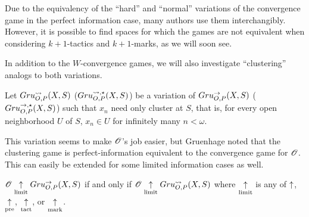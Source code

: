 Due to the equivalency of the ``hard'' and ``normal'' variations of the
convergence game in the perfect information case, many authors use them
interchangibly. However, it is possible to find spaces for which the games are
not equivalent when considering $k+1$-tactics and $k+1$-marks, as we will
soon see.

In addition to the $W$-convergence games, we will also investigate
``clustering'' analogs to both variations.

\begin{game}
  Let $Gru_{O,P}^{\leadsto}(X,S)$ ($Gru_{O,P}^{\leadsto,\star}(X,S)$) be a variation of
  $Gru_{O,P}^{\to}(X,S)$ ($Gru_{O,P}^{\to,\star}(X,S)$) such that $x_n$ need only
  cluster at $S$, that is, for every open neighborhood $U$ of $S$, $x_n\in U$
  for infinitely many $n<\omega$.
\end{game}

This variation seems to make $\mathscr{O}$'s job easier, but Gruenhage noted that
the clustering game is perfect-information equivalent to the convergence game
for $\mathscr{O}$. This can easily be extended for some limited information cases
as well.

\begin{prop}
  $\mathscr{O} \underset{\text{limit}}{\uparrow} Gru_{O,P}^{\to}(X,S)$
    if and only if
  $\mathscr{O} \underset{\text{limit}}{\uparrow} Gru_{O,P}^{\leadsto}(X,S)$
  where $\underset{\text{limit}}{\uparrow}$ is any of $\uparrow$, $\underset{\text{pre}}{\uparrow}$, $\underset{\text{tact}}{\uparrow}$, or $\underset{\text{mark}}{\uparrow}$.
\end{prop}

